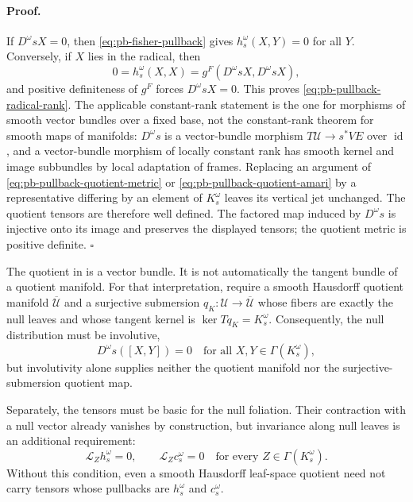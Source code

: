 \paragraph{Proof.}
If $D^\omega sX=0$, then \eqref{eq:pb-fisher-pullback} gives
$h_s^\omega(X,Y)=0$ for all $Y$.  Conversely, if $X$ lies in the radical,
then
\[
0=h_s^\omega(X,X)
=g^F(D^\omega sX,D^\omega sX),
\]
and positive definiteness of $g^F$ forces $D^\omega sX=0$.  This proves
\eqref{eq:pb-pullback-radical-rank}.  The applicable constant-rank statement is
the one for morphisms of smooth vector bundles over a fixed base, not the
constant-rank theorem for smooth maps of manifolds: $D^\omega s$ is a
vector-bundle morphism $T\mathcal U\to s^*VE$ over $\operatorname{id}$, and a
vector-bundle morphism of locally constant rank has smooth kernel and image
subbundles by local adaptation of frames.  Replacing an argument of
\eqref{eq:pb-pullback-quotient-metric} or
\eqref{eq:pb-pullback-quotient-amari} by a representative differing by an
element of $K_s^\omega$ leaves its vertical jet unchanged.  The quotient
tensors are therefore well defined.  The factored map induced by
$D^\omega s$ is injective onto its image and preserves the displayed tensors;
the quotient metric is positive definite.  $\square$

The quotient in  is a vector bundle.  It
is not automatically the tangent bundle of a quotient manifold.  For that
interpretation, require a smooth Hausdorff quotient manifold
$\overline{\mathcal U}$ and a surjective submersion
$q_K:\mathcal U\to\overline{\mathcal U}$ whose fibers are exactly the null
leaves and whose tangent kernel is
$\ker Tq_K=K_s^\omega$.  Consequently, the null distribution must be
involutive,
\begin{equation}
D^\omega s([X,Y])=0
\quad
\text{for all }X,Y\in\Gamma(K_s^\omega),
\label{eq:pb-null-involutivity}
\end{equation}
but involutivity alone supplies neither the quotient manifold nor the
surjective-submersion quotient map. 

Separately, the tensors must be basic for the null foliation.  Their contraction with a null
vector already vanishes by construction, but invariance along null leaves is
an additional requirement:
\begin{equation}
\mathcal L_Zh_s^\omega=0,
\qquad
\mathcal L_Zc_s^\omega=0
\quad\text{for every }Z\in\Gamma(K_s^\omega).
\label{eq:pb-null-basicness}
\end{equation}
Without this condition, even a smooth Hausdorff leaf-space quotient need not
carry tensors whose pullbacks are $h_s^\omega$ and $c_s^\omega$.

